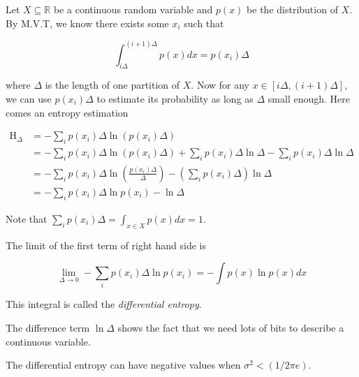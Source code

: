 \documentclass{article}
\begin{document}
            Let $ X \subseteq \mathbb{R} $ be a continuous random variable and $ p(x) $ be the
            distribution of $ X $. By M.V.T, we know there exists some $ x_i $
            such that

            \begin{equation*}
                 \int_{i \Delta}^{ (i+1)\Delta }p(x) dx = p(x_i) \Delta
            \end{equation*}

            where $ \Delta $ is the length of one partition of $ X $. Now for any
            $ x \in [i \Delta, (i + 1) \Delta]$, we can use $ p(x_i) \Delta $ to estimate
            its probability as long as $ \Delta $ small enough. Here comes an
            entropy estimation

            \begin{align*}
                \operatorname{H}_{\Delta} &= - \sum_i p(x_i) \Delta \ln( p(x_i) \Delta) \\
                      &= - \sum_i p(x_i) \Delta \ln(p(x_i) \Delta) +
                             \sum_i p(x_i) \Delta \ln \Delta -
                             \sum_i p(x_i) \Delta \ln \Delta \\
                      &= - \sum_i p(x_i) \Delta \ln \left(
                                \frac{p(x_i) \Delta}{\Delta}
                            \right) - \left(
                                \sum_i p(x_i) \Delta
                            \right) \ln \Delta \\
                      &= - \sum_i p(x_i) \Delta \ln p(x_i) - \ln \Delta
            \end{align*}

            Note that $ \sum_i p(x_i) \Delta = \int_{x \in X} p(x) dx = 1 $.

            The limit of the first term of right hand side is

            \begin{equation*}
                 \lim_{\Delta \rightarrow 0} - \sum_i p(x_i) \Delta \ln p(x_i)
                 = - \int p(x) \ln p(x) dx
            \end{equation*}

            This integral is called the \textit{differential entropy}.

            The difference term $ \ln \Delta $ shows the fact that we need lots of bits to
            describe a continuous variable.

            The differential entropy can have negative values when $ \sigma^2 < (1 / 2 \pi e) $.
\end{document}

